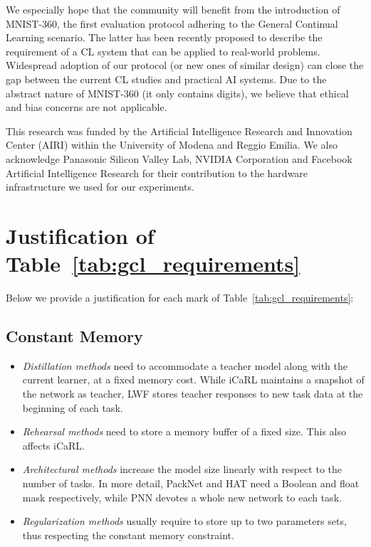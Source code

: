 \documentclass{article}
\begin{document}
We especially hope that the community will benefit from the introduction of MNIST-360, the first evaluation protocol adhering to the General Continual Learning scenario. The latter has been recently proposed to describe the requirement of a CL system that can be applied to real-world problems. Widespread adoption of our protocol (or new ones of similar design) can close the gap between the current CL studies and practical AI systems. Due to the abstract nature of MNIST-360 (it only contains digits), we believe that ethical and bias concerns are not applicable.

\begin{ack}
This research was funded by the Artificial Intelligence Research and Innovation Center (AIRI) within the University of Modena and Reggio Emilia. We also acknowledge Panasonic
Silicon Valley Lab, NVIDIA Corporation and Facebook Artificial Intelligence Research for their contribution to the hardware infrastructure we used for our experiments.
\end{ack}


\small {

}

\normalsize
\appendix
\clearpage{}\section {Justification of Table~\ref{tab:gcl_requirements}}
\label{app:justifications}

Below we provide a justification for each mark of Table~\ref{tab:gcl_requirements}:
\subsection{Constant Memory}
    \begin{itemize}
        \item \textit{Distillation methods} need to accommodate a teacher model along with the current learner, at a fixed memory cost. While iCaRL maintains a snapshot of the network as teacher, LWF stores teacher responses to new task data at the beginning of each task.
        \item \textit{Rehearsal methods} need to store a memory buffer of a fixed size. This also affects iCaRL.
        \item \textit{Architectural methods} increase the model size linearly with respect to the number of tasks. In more detail, PackNet and HAT need a Boolean and float mask respectively, while PNN devotes a whole new network to each task.
        \item \textit{Regularization methods} usually require to store up to two parameters sets, thus respecting the constant memory constraint.
    \end{itemize}
\end{document}
